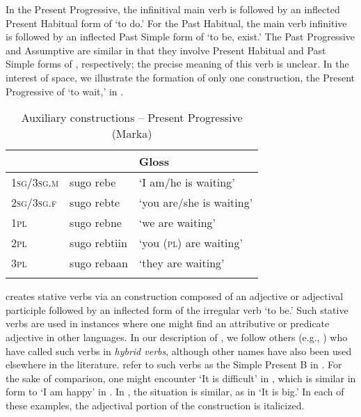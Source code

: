 \documentclass[output=paper,modfonts,nonflat,
hidelinks
]{langsci/langscibook}
\begin{document}
 In the  Present Progressive, the infinitival main verb is followed by an inflected Present Habitual form of  `to do.' For the Past Habitual, the main verb infinitive is followed by an inflected Past Simple form of  `to be, exist.' The Past Progressive and Assumptive are similar in that they involve Present Habitual and Past Simple forms of , respectively; the precise meaning of this verb is unclear. In the interest of space, we illustrate the formation of only one  construction, the Present Progressive of  `to wait,' in . 
 
 \begin{table}
 	\caption{{Auxiliary constructions -- Present Progressive (Marka)}}
 	\label{tab:1:Auxiliary}
 	\begin{tabularx}{\textwidth}{Xll} 
 		\lsptoprule
 		& \ilit{Marka}   & Gloss    \\
 		\midrule
 		1\textsc{sg}/3\textsc{sg.m} & sugo rebe & `I am/he is waiting' \\
 		2\textsc{sg}/3\textsc{sg.f} & sugo rebte  & `you are/she is waiting'  \\
 		1\textsc{pl} & sugo rebne & `we are waiting'  \\
 		2\textsc{pl} & sugo rebtiin & `you (\textsc{pl}) are waiting'  \\
 		3\textsc{pl} & sugo rebaan & `they are waiting'  \\
 		\lspbottomrule
 	\end{tabularx}
 \end{table}
 
  creates stative verbs via an  construction composed of an adjective or adjectival participle followed by an inflected form of the irregular verb  `to be.' Such stative verbs are used in instances where one might find an attributive or predicate adjective in other languages. In our description of , we follow others (e.g., \citealt{Andrzejewski1969,AjelloPuglielli1988}) who have called such verbs in  \textit{hybrid verbs}, although other names have also been used elsewhere in the literature. \citet{PasterRanero2015} refer to such verbs as the Simple Present B in . For the sake of comparison, one might encounter  `It is difficult' in , which is similar in form to  `I am happy' in . In , the situation is similar, as in  `It is big.' In each of these examples, the adjectival portion of the  construction is italicized.
 
\end{document}
